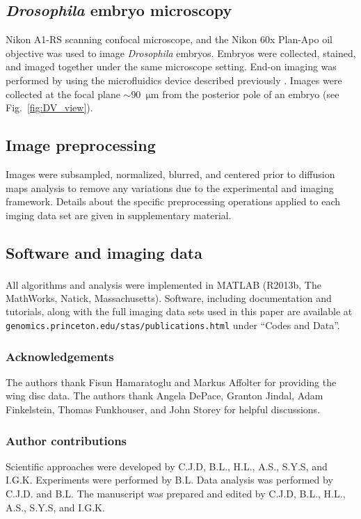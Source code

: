 \documentclass[twocolumn, 10pt]{article}
\newcommand{\SI}[0]{supplementary material}
\newcommand{\fig}[0]{Fig.}
\begin{document}
\subsection*{{\em Drosophila} embryo microscopy}
%
Nikon A1-RS scanning confocal microscope, and the Nikon 60x Plan-Apo oil objective was used to image {\em Drosophila} embryos.
%
Embryos were collected, stained, and imaged together under the same microscope setting.
%
End-on imaging was performed by using the microfluidics device described previously \citep{chung2010microfluidic}.
%
Images were collected at the focal plane $\sim$90~$\mathrm{\mu m}$ from the posterior pole of an embryo (see \fig~\ref{fig:DV_view}).

\subsection*{Image preprocessing}

Images were subsampled, normalized, blurred, and centered prior to diffusion maps analysis to remove any variations due to the experimental and imaging framework.
%
Details about the specific preprocessing operations applied to each imging data set are given in \SI.


\subsection*{Software and imaging data}
%
All algorithms and analysis were implemented in MATLAB\textsuperscript{\textregistered} (R2013b, The MathWorks, Natick, Massachusetts).
%
Software, including documentation and tutorials, along with the full imaging data sets used in this paper are available at \texttt{genomics.princeton.edu/stas/publications.html} under ``Codes and Data''.




\subsubsection*{Acknowledgements}

The authors thank Fisun Hamaratoglu and Markus Affolter for providing the wing disc data.
%
The authors thank Angela DePace, Granton Jindal, Adam Finkelstein,  Thomas Funkhouser, and John Storey for helpful discussions.


\subsubsection*{Author contributions}
Scientific approaches were developed by C.J.D, B.L., H.L., A.S., S.Y.S, and I.G.K.
%
Experiments were performed by B.L.
%
Data analysis was performed by C.J.D. and B.L.
%
The manuscript was prepared and edited by C.J.D, B.L., H.L., A.S., S.Y.S, and I.G.K.
\end{document}
